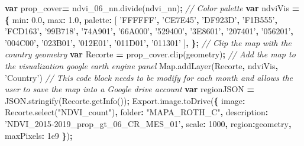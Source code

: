 \documentclass[
  10pt,
  b5paper,
]{book}
\newenvironment{Shaded}{\begin{snugshade}}{\end{snugshade}}
\newcommand{\AttributeTok}[1]{\textcolor[rgb]{0.77,0.63,0.00}{#1}}
\newcommand{\CommentTok}[1]{\textcolor[rgb]{0.56,0.35,0.01}{\textit{#1}}}
\newcommand{\DataTypeTok}[1]{\textcolor[rgb]{0.13,0.29,0.53}{#1}}
\newcommand{\DecValTok}[1]{\textcolor[rgb]{0.00,0.00,0.81}{#1}}
\newcommand{\FloatTok}[1]{\textcolor[rgb]{0.00,0.00,0.81}{#1}}
\newcommand{\KeywordTok}[1]{\textcolor[rgb]{0.13,0.29,0.53}{\textbf{#1}}}
\newcommand{\NormalTok}[1]{#1}
\newcommand{\OperatorTok}[1]{\textcolor[rgb]{0.81,0.36,0.00}{\textbf{#1}}}
\newcommand{\StringTok}[1]{\textcolor[rgb]{0.31,0.60,0.02}{#1}}
\newcommand{\VariableTok}[1]{\textcolor[rgb]{0.00,0.00,0.00}{#1}}
\begin{document}
\begin{Shaded}
\begin{Highlighting}[]
\KeywordTok{var}\NormalTok{ prop_cover}\OperatorTok{=} \VariableTok{ndvi_06_nn}\NormalTok{.}\AttributeTok{divide}\NormalTok{(ndvi_nn)}\OperatorTok{;}
 \CommentTok{// Color palette}
\KeywordTok{var}\NormalTok{ ndviVis }\OperatorTok{=} \OperatorTok{\{}
  \DataTypeTok{min}\OperatorTok{:} \FloatTok{0.0}\OperatorTok{,}
  \DataTypeTok{max}\OperatorTok{:} \FloatTok{1.0}\OperatorTok{,}
  \DataTypeTok{palette}\OperatorTok{:}\NormalTok{ [}
    \StringTok{'FFFFFF'}\OperatorTok{,} \StringTok{'CE7E45'}\OperatorTok{,} \StringTok{'DF923D'}\OperatorTok{,} \StringTok{'F1B555'}\OperatorTok{,} \StringTok{'FCD163'}\OperatorTok{,} \StringTok{'99B718'}\OperatorTok{,} \StringTok{'74A901'}\OperatorTok{,}
    \StringTok{'66A000'}\OperatorTok{,} \StringTok{'529400'}\OperatorTok{,} \StringTok{'3E8601'}\OperatorTok{,} \StringTok{'207401'}\OperatorTok{,} \StringTok{'056201'}\OperatorTok{,} \StringTok{'004C00'}\OperatorTok{,} \StringTok{'023B01'}\OperatorTok{,}
    \StringTok{'012E01'}\OperatorTok{,} \StringTok{'011D01'}\OperatorTok{,} \StringTok{'011301'}
\NormalTok{ ]}\OperatorTok{,}
\OperatorTok{\};}
 \CommentTok{// Clip the map with the country geometry}
\KeywordTok{var}\NormalTok{ Recorte }\OperatorTok{=} \VariableTok{prop_cover}\NormalTok{.}\AttributeTok{clip}\NormalTok{(geometry)}\OperatorTok{;}
 \CommentTok{// Add the map to the visualization google earth engine panel}
\VariableTok{Map}\NormalTok{.}\AttributeTok{addLayer}\NormalTok{(Recorte}\OperatorTok{,}\NormalTok{ ndviVis}\OperatorTok{,} \StringTok{'Country'}\NormalTok{)}
 \CommentTok{// This code block needs to be modify for each month and allows the user to save the map into a Google drive account}
\KeywordTok{var}\NormalTok{ regionJSON }\OperatorTok{=} \VariableTok{JSON}\NormalTok{.}\AttributeTok{stringify}\NormalTok{(}\VariableTok{Recorte}\NormalTok{.}\AttributeTok{getInfo}\NormalTok{())}\OperatorTok{;}
\VariableTok{Export}\NormalTok{.}\VariableTok{image}\NormalTok{.}\AttributeTok{toDrive}\NormalTok{(}\OperatorTok{\{}
          \DataTypeTok{image}\OperatorTok{:} \VariableTok{Recorte}\NormalTok{.}\AttributeTok{select}\NormalTok{(}\StringTok{"NDVI_count"}\NormalTok{)}\OperatorTok{,}
          \DataTypeTok{folder}\OperatorTok{:} \StringTok{"MAPA_ROTH_C"}\OperatorTok{,}
          \DataTypeTok{description}\OperatorTok{:} \StringTok{'NDVI_2015-2019_prop_gt_06_CR_MES_01'}\OperatorTok{,} 
          \DataTypeTok{scale}\OperatorTok{:} \DecValTok{1000}\OperatorTok{,}
          \DataTypeTok{region}\OperatorTok{:}\NormalTok{geometry}\OperatorTok{,}
          \DataTypeTok{maxPixels}\OperatorTok{:} \FloatTok{1e9}     
\OperatorTok{\}}\NormalTok{)}\OperatorTok{;}
\end{Highlighting}
\end{Shaded}
\end{document}

